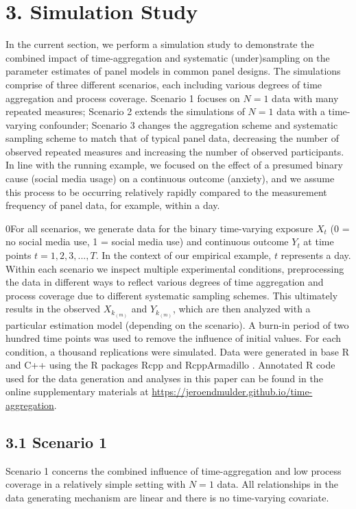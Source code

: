 \documentclass[man]{apa7} %
\begin{document}
\section{3. Simulation Study}
In the current section, we perform a simulation study to demonstrate the combined impact of time-aggregation and systematic (under)sampling on the parameter estimates of panel models in common panel designs. The simulations comprise of three different scenarios, each including various degrees of time aggregation and process coverage. Scenario 1 focuses on $N = 1$ data with many repeated measures; Scenario 2 extends the simulations of $N = 1$ data with a time-varying confounder; Scenario 3 changes the aggregation scheme and systematic sampling scheme to match that of typical panel data, decreasing the number of observed repeated measures and increasing the number of observed participants. In line with the running example, we focused on the effect of a presumed binary cause (social media usage) on a continuous outcome (anxiety), and we assume this process to be occurring relatively rapidly compared to the measurement frequency of panel data, for example, within a day. 

0For all scenarios, we generate data for the binary time-varying exposure $X_{t}$ (0 = no social media use, 1 = social media use) and continuous outcome $Y_{t}$ at time points $t = 1, 2, 3, ..., T$. In the context of our empirical example, $t$ represents a day. Within each scenario we inspect multiple experimental conditions, preprocessing the data in different ways to reflect various degrees of time aggregation and process coverage due to different systematic sampling schemes. This ultimately results in the observed $X_{k_{(m)}}$ and $Y_{k_{(m)}}$, which are then analyzed with a particular estimation model (depending on the scenario). A burn-in period of two hundred time points was used to remove the influence of initial values. For each condition, a thousand replications were simulated. Data were generated in base R \parencite[version 4.4.1;][]{r_core_team_r_2024} and C++ \parencite{stroustrup_c_2013} using the R packages Rcpp \parencite[version 1.0.13;][]{eddelbuettel_rcpp_2011} and RcppArmadillo \parencite[version 14.0.2-1;][]{eddelbuettel_rcpparmadillo_2014}. Annotated R code used for the data generation and analyses in this paper can be found in the online supplementary materials at \url{https://jeroendmulder.github.io/time-aggregation}. 

\subsection{3.1 Scenario 1}
Scenario 1 concerns the combined influence of time-aggregation and low process coverage in a relatively simple setting with $N = 1$ data. All relationships in the data generating mechanism are linear and there is no time-varying covariate. 
\end{document}
